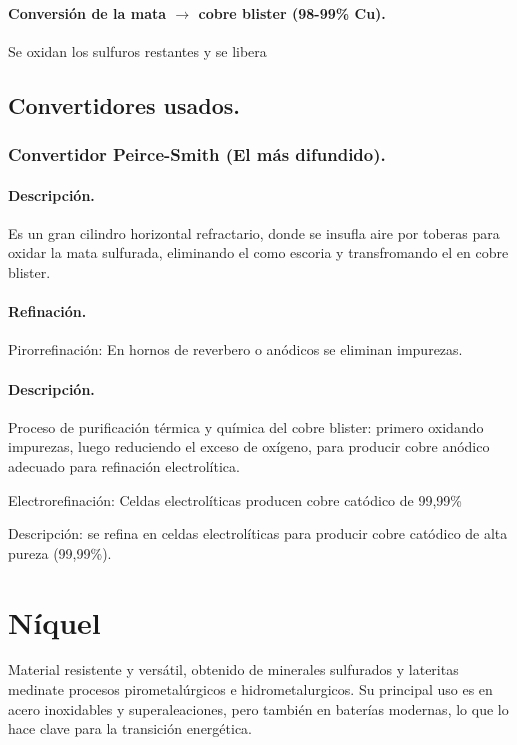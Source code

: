 \documentclass[12pt,a4paper]{article}
\begin{document}
\paragraph{Conversión de la mata $\longrightarrow$ cobre blister (98-99\% Cu).} Se oxidan los sulfuros restantes y se libera 

\subsection{Convertidores usados.}

\subsubsection{Convertidor Peirce-Smith (El más difundido).} 

\paragraph{Descripción.} Es un gran cilindro horizontal refractario, donde se insufla aire por toberas para oxidar la mata sulfurada, eliminando el  como escoria y transfromando el  en cobre blister.

\paragraph{Refinación.} Pirorrefinación: En hornos de reverbero o anódicos se eliminan impurezas.

\paragraph{Descripción.} Proceso de purificación  térmica y química del cobre blister: primero oxidando impurezas, luego reduciendo el exceso de oxígeno, para producir cobre anódico adecuado para refinación electrolítica.

Electrorefinación: Celdas electrolíticas producen cobre catódico de 99,99\%

Descripción: se refina en celdas electrolíticas para producir cobre catódico de alta pureza (99,99\%).

\section{Níquel}

Material resistente y versátil, obtenido de minerales sulfurados y lateritas medinate procesos pirometalúrgicos e hidrometalurgicos. Su principal uso es en acero inoxidables y superaleaciones, pero también en baterías modernas, lo que lo hace clave para la transición energética.
\end{document}
